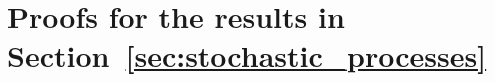 \documentclass[10pt,a4paper]{paper}
\theoremstyle{definition}
\newtheorem{lemma}[theorem]{Lemma}
\newcommand{\reals}{\mathbb{R}}
\newcommand{\realsnonneg}{\reals_{\geq 0}}
\newcommand{\processes}{\mathbb{P}}
\newcommand{\wmprocesses}{\processes^{\mathrm{WM}}}
\newcommand{\rateset}{\mathcal{Q}}
\newcommand{\norm}[1]{\left\lVert #1 \right\rVert}
\newcommand{\coloneqq}{:\!=}
\begin{document}

\section{Proofs for the results in Section~\ref{sec:stochastic_processes}}\label{app:stoch_proc}
\end{document}
